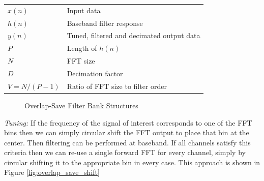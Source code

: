 \documentclass[12pt]{report}
\begin{document}
\begin{tabular}{ll}
    $x(n)$        & Input data \\
    $h(n)$        & Baseband filter response \\
    $y(n)$        & Tuned, filtered and decimated output data \\
    $P$           & Length of $h(n)$ \\
    $N$           & FFT size \\
    $D$           & Decimation factor \\
    $V = N/(P-1)$ & Ratio of FFT size to filter order \\
\end{tabular}

\begin{figure}[h!]
\centerline{
    \hfill
}
\caption{Overlap-Save Filter Bank Structures}
\label{fig:overlap_save_filter_banks}
\end{figure}

\emph{Tuning:} If the frequency of the signal of interest corresponds to one of
the FFT bins then we can simply circular shift the FFT output to place that bin
at the center. Then filtering can be performed at baseband.  If all channels
satisfy this criteria then we can re-use a single forward FFT for every
channel, simply by circular shifting it to the appropriate bin in every case. 
This approach is shown in Figure \ref{fig:overlap_save_shift}
\end{document}
